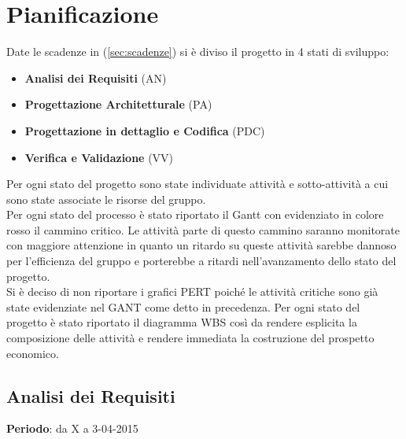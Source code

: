 \section{Pianificazione}{
	Date le scadenze in (\ref{sec:scadenze}) si è diviso il progetto in 4 stati di sviluppo:
	\begin{itemize}
		\item \textbf{Analisi dei Requisiti} (AN)
		\item \textbf{Progettazione Architetturale} (PA)
		\item \textbf{Progettazione in dettaglio e Codifica} (PDC)
		\item \textbf{Verifica e Validazione} (VV)
	\end{itemize}
	
	Per ogni stato del progetto sono state individuate attività e sotto-attività a cui sono state associate le risorse del gruppo.\\
	Per ogni stato del processo è stato riportato il Gantt con evidenziato in colore rosso il cammino critico. Le attività parte di questo cammino saranno monitorate con maggiore attenzione in quanto un ritardo su queste attività	sarebbe dannoso per l'efficienza del gruppo e porterebbe a ritardi nell'avanzamento dello stato del progetto.\\
	Si è deciso di non riportare i grafici PERT poiché le attività critiche sono già state evidenziate nel GANT come detto in precedenza.
	Per ogni stato del progetto è stato riportato il diagramma WBS così da rendere esplicita la composizione delle attività e rendere immediata la costruzione del prospetto economico.
	
\subsection{Analisi dei Requisiti}{
	\textbf{Periodo}: da X a 3-04-2015 \\
	
}}
